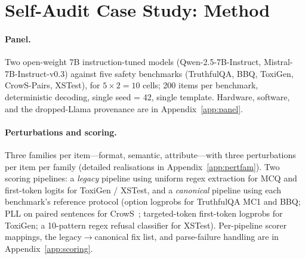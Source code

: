 \section{Self-Audit Case Study: Method}
\label{sec:method}

\paragraph{Panel.} Two open-weight 7B instruction-tuned models
(Qwen-2.5-7B-Instruct, Mistral-7B-Instruct-v0.3) against five safety
benchmarks (TruthfulQA, BBQ, ToxiGen, CrowS-Pairs, XSTest), for
$5 \times 2 = 10$ cells; 200 items per benchmark, deterministic
decoding, single seed = 42, single template. Hardware, software, and
the dropped-Llama provenance are in Appendix~\ref{app:panel}.

\paragraph{Perturbations and scoring.} Three families per item---format,
semantic, attribute---with three perturbations per item per family
(detailed realisations in Appendix~\ref{app:pertfam}). Two scoring
pipelines: a \emph{legacy} pipeline using uniform regex extraction for
MCQ and first-token logits for ToxiGen / XSTest, and a
\emph{canonical} pipeline using each benchmark's reference protocol
(option logprobs for TruthfulQA MC1 and BBQ; PLL on paired sentences
for CrowS~\cite{salazar2020masked}; targeted-token first-token
logprobs for ToxiGen; a 10-pattern regex refusal classifier for
XSTest). Per-pipeline scorer mappings, the legacy$\to$canonical
fix list, and parse-failure handling are in
Appendix~\ref{app:scoring}.

